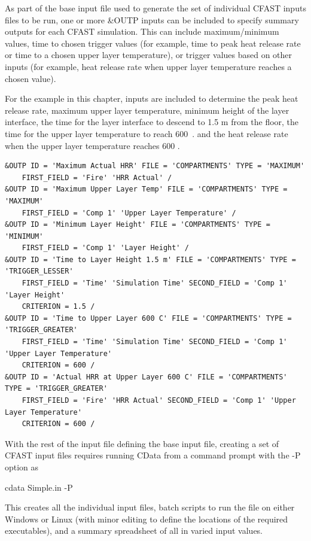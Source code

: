 \documentclass[12pt,twoside]{book}
\begin{document}
As part of the base input file used to generate the set of individual CFAST inputs files to be run, one or more {\ct \&OUTP} inputs can be included to specify summary outputs for each CFAST simulation. This can include maximum/minimum values, time to chosen trigger values (for example, time to peak heat release rate or time to a chosen upper layer temperature), or trigger values based on other inputs (for example, heat release rate when upper layer temperature reaches a chosen value).

For the example in this chapter, inputs are included to determine the peak heat release rate, maximum upper layer temperature, minimum height of the layer interface, the time for the layer interface to descend to 1.5 m from the floor, the time for the upper layer temperature to reach 600~\degc. and the heat release rate when the upper layer temperature reaches 600 \degc.

\begin{lstlisting}[language=cdata, basicstyle=\scriptsize]
&OUTP ID = 'Maximum Actual HRR' FILE = 'COMPARTMENTS' TYPE = 'MAXIMUM'
    FIRST_FIELD = 'Fire' 'HRR Actual' /
&OUTP ID = 'Maximum Upper Layer Temp' FILE = 'COMPARTMENTS' TYPE = 'MAXIMUM'
    FIRST_FIELD = 'Comp 1' 'Upper Layer Temperature' /
&OUTP ID = 'Minimum Layer Height' FILE = 'COMPARTMENTS' TYPE = 'MINIMUM'
    FIRST_FIELD = 'Comp 1' 'Layer Height' /
&OUTP ID = 'Time to Layer Height 1.5 m' FILE = 'COMPARTMENTS' TYPE = 'TRIGGER_LESSER'
    FIRST_FIELD = 'Time' 'Simulation Time' SECOND_FIELD = 'Comp 1' 'Layer Height'
    CRITERION = 1.5 /
&OUTP ID = 'Time to Upper Layer 600 C' FILE = 'COMPARTMENTS' TYPE = 'TRIGGER_GREATER'
    FIRST_FIELD = 'Time' 'Simulation Time' SECOND_FIELD = 'Comp 1' 'Upper Layer Temperature'
    CRITERION = 600 /
&OUTP ID = 'Actual HRR at Upper Layer 600 C' FILE = 'COMPARTMENTS' TYPE = 'TRIGGER_GREATER'
    FIRST_FIELD = 'Fire' 'HRR Actual' SECOND_FIELD = 'Comp 1' 'Upper Layer Temperature'
    CRITERION = 600 /
\end{lstlisting}

With the rest of the input file defining the base input file, creating a set of CFAST input files requires running CData from a command prompt with the {\ct -P} option as

{\ct cdata Simple.in -P}

This creates all the individual input files, batch scripts to run the file on either Windows or Linux (with minor editing to define the locations of the required executables), and a summary spreadsheet of all in varied input values.
\end{document}
